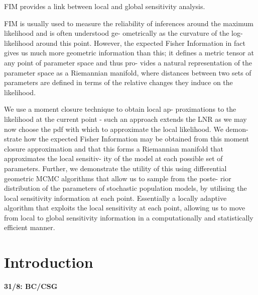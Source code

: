 \documentclass{pnastwo}
\begin{document}
\begin{article}
FIM provides a link between local and global sensitivity
analysis.

FIM is usually used to measure the reliability of inferences
around the maximum likelihood and is often understood ge-
ometrically as the curvature of the log-likelihood around this
point. However, the expected Fisher Information in fact gives
us much more geometric information than this; it defines a
metric tensor at any point of parameter space and thus pro-
vides a natural representation of the parameter space as a
Riemannian manifold, where distances between two sets of
parameters are defined in terms of the relative changes they
induce on the likelihood.

We use a moment closure technique to obtain local ap-
proximations to the likelihood at the current point - such an
approach extends the LNR as we may now choose the pdf
with which to approximate the local likelihood. We demon-
strate how the expected Fisher Information may be obtained
from this moment closure approximation and that this forms
a Riemannian manifold that approximates the local sensitiv-
ity of the model at each possible set of parameters. Further,
we demonstrate the utility of this using differential geometric
MCMC algorithms that allow us to sample from the poste-
rior distribution of the parameters of stochastic population
models, by utilising the local sensitivity information at each
point. Essentially a locally adaptive algorithm that exploits
the local sensitivity at each point, allowing us to move from
local to global sensitivity information in a computationally
and statistically efficient manner.

\section{Introduction}
\label{s:intro}\textbf{31/8: BC/CSG}


\end{article}
\end{document}
